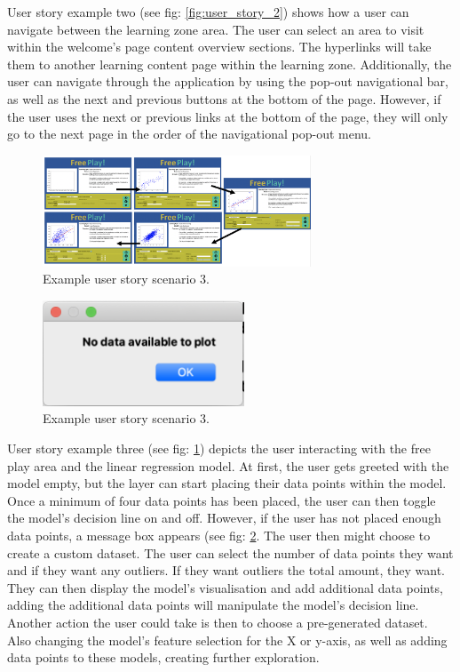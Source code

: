 	
	User story example two (see fig: \ref{fig:user_story_2}) shows how a user can navigate between the learning zone area. The user can select an area to visit within the welcome's page content overview sections. The hyperlinks will take them to another learning content page within the learning zone. Additionally, the user can navigate through the application by using the pop-out navigational bar, as well as the next and previous buttons at the bottom of the page. However, if the user uses the next or previous links at the bottom of the page, they will only go to the next page in the order of the navigational pop-out menu.
	
	\begin{figure}[t]
		\begin{center}
			\includegraphics[width=8cm]{graphics/fp_us_example.png}
			\caption{Example user story scenario 3.}
			\label{fig:user_story_3}
		\end{center}
	\end{figure}

	\begin{figure}[b]
		\begin{center}
			\includegraphics[width=6cm]{graphics/not_enough_data.png}
			\caption{Example user story scenario 3.}
			\label{fig:not_enough_data}
		\end{center}
	\end{figure}
	
	
	User story example three (see fig: \ref{fig:user_story_3}) depicts the user interacting with the free play area and the linear regression model. At first, the user gets greeted with the model empty, but the layer can start placing their data points within the model. Once a minimum of four data points has been placed, the user can then toggle the model's decision line on and off. However, if the user has not placed enough data points, a message box appears (see fig: \ref{fig:not_enough_data}. The user then might choose to create a custom dataset. The user can select the number of data points they want and if they want any outliers. If they want outliers the total amount, they want. They can then display the model's visualisation and add additional data points, adding the additional data points will manipulate the model's decision line. Another action the user could take is then to choose a pre-generated dataset. Also changing the model's feature selection for the X or y-axis, as well as adding data points to these models, creating further exploration.
	
		
	
	
	
